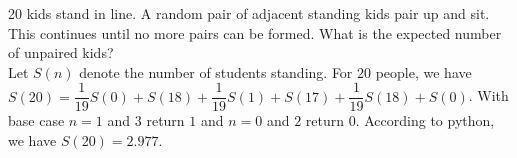 \documentclass{article}
\begin{document}
\clearpage
\begin{addmargin}[2em]{2em}
	20 kids stand in line. A random pair of adjacent standing kids pair up and sit. This continues until no more pairs
	can be formed. What is the expected number of unpaired kids?\\
	Let $S(n)$ denote the number of students standing. For $20$ people, we have $S(20) = \dfrac{1}{19} S(0) + S(18) + \dfrac{1}{19} S(1) + S(17) + \dfrac{1}{19} S(18) + S(0)$. With base case $n = 1$ and $3$ return $1$ and $n = 0$ and $2$ return $0$. According to python, we have $S(20) = 2.977$.
\end{addmargin}
\end{document}

